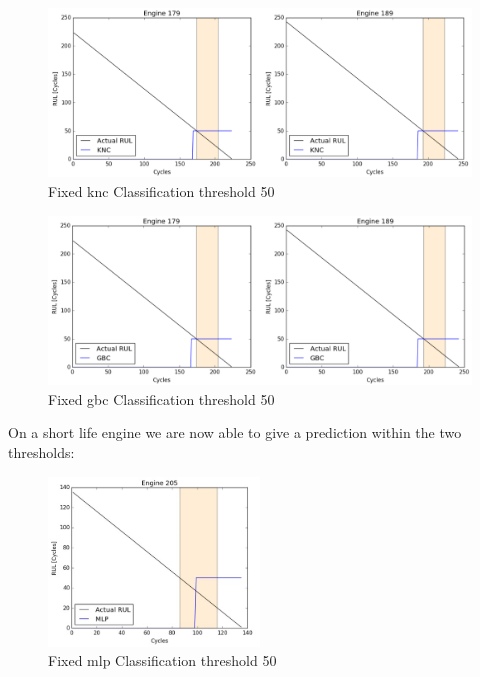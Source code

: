 \documentclass[english, a4paper]{report}
\begin{document}
{{{            \begin{figure}[H]
                \centering
                \includegraphics[width=\textwidth]{Fixed_KNCClassi_50}
                \caption{Fixed \gls{knc} Classification threshold 50}
                \label{fig:FixedKNCClassi50}
            \end{figure}
            
            \begin{figure}[H]
                \centering
                \includegraphics[width=\textwidth]{Fixed_GBCClassi_50}
                \caption{Fixed \gls{gbc} Classification threshold 50}
                \label{fig:FixedGBCClassi50}
            \end{figure}
            
            On a short life engine we are now able to give a prediction within the two thresholds: 
            
            \begin{figure}[H]
                \centering
                \includegraphics[width=0.5\textwidth]{Fixed_MLPClassi_50_Eng205}
                \caption{Fixed \gls{mlp} Classification threshold 50}
                \label{fig:FixedMLPClassi50Eng205}
            \end{figure}
        }
        
}}
\end{document}
